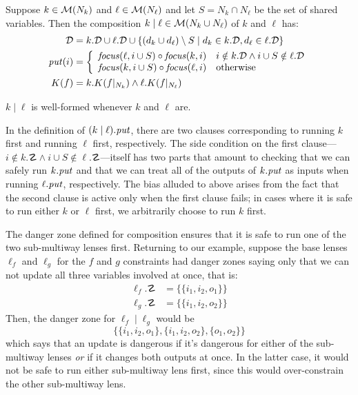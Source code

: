 \begin{definition}
    Suppose $k \in \mathcal M(N_k)$ and $\ell \in \mathcal M(N_\ell)$ and let $S =
    N_k \cap N_\ell$ be the set of shared variables. Then the composition
    $k\mid\ell \in \mathcal M(N_k \cup N_\ell)$ of $k$ and $\ell$ has:
    \begin{align*}
        \mathcal D &= k.\mathcal D \cup \ell.\mathcal D \cup
            \{(d_k \cup d_\ell) \setminus S
            \mid d_k \in k.\mathcal D, d_\ell \in \ell.\mathcal D\} \\
        \mathit{put}(i) &= \left\{\begin{array}{ll}
            \mathit{focus}(\ell,i\cup S) \circ \mathit{focus}(k,i)
                & i \notin k.\mathcal D \land i\cup S \notin \ell.\mathcal D \\
            \mathit{focus}(k,i\cup S) \circ \mathit{focus}(\ell,i)
                & \mbox{otherwise}
            \end{array}\right. \\
        K(f) &= k.K(f|_{N_k}) \land \ell.K(f|_{N_\ell})
    \end{align*}
\end{definition}

\begin{lemma}
    $k\mid\ell$ is well-formed whenever $k$ and $\ell$ are.
\end{lemma}

In the definition of $(k\mid\ell).\mathit{put}$, there are two clauses
corresponding to running $k$ first and running $\ell$ first, respectively.
The side condition on the first clause---$i \notin k.\danger \land i \cup S
\notin \ell.\danger$---itself has two parts that amount to
checking that we can safely run $k.\mathit{put}$ and that we can treat all of the
outputs of $k.\mathit{put}$ as inputs when running $\ell.\mathit{put}$, respectively. The
bias alluded to above arises from the fact that the second clause is active
only when the first clause fails; in cases where it is safe to run either
$k$ or $\ell$ first, we arbitrarily choose to run $k$ first.

The danger zone defined for composition ensures that it is safe to run one
of the two sub-multiway lenses first. Returning to our example, suppose the
base lenses $\ell_f$ and $\ell_g$ for the $f$ and $g$ constraints had danger
zones saying only that we can not update all three variables involved at
once, that is:
\begin{align*}
    \ell_f.\danger &= \{\{i_1,i_2,o_1\}\} \\
    \ell_g.\danger &= \{\{i_1,i_2,o_2\}\}
\end{align*}
Then, the danger zone for $\ell_f \mid \ell_g$ would be
\[\{\{i_1,i_2,o_1\},\{i_1,i_2,o_2\},\{o_1,o_2\}\}\]
which says that an update is dangerous if it's dangerous for either of the
sub-multiway lenses \emph{or} if it changes both outputs at once. In the
latter case, it would not be safe to run either sub-multiway lens first,
since this would over-constrain the other sub-multiway lens.

